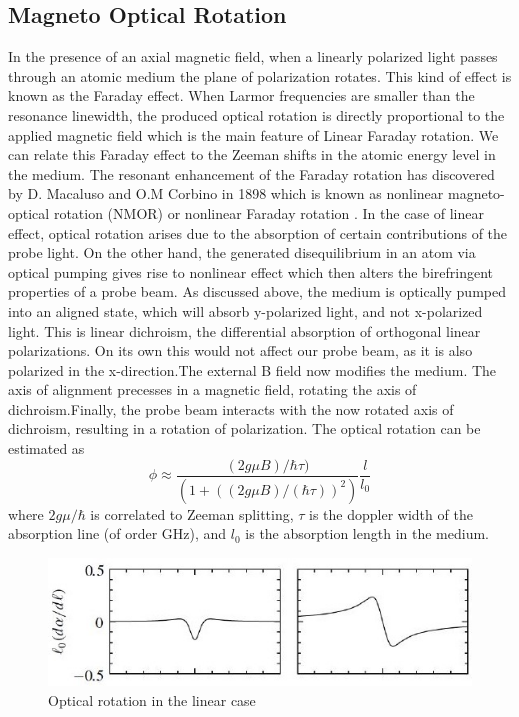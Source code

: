 \subsection{Magneto Optical Rotation}
\bigskip
In the presence of an axial magnetic field, when a linearly polarized light passes through an atomic medium the plane of polarization rotates. This kind of effect is known as the Faraday effect. When Larmor frequencies are smaller than the resonance linewidth, the produced optical rotation is directly proportional to the applied magnetic field which is the main feature of Linear Faraday rotation. We can relate this Faraday effect to the Zeeman shifts in the atomic energy level in the medium. The resonant enhancement of the Faraday rotation has discovered by D. Macaluso and O.M Corbino in 1898 which is known as nonlinear magneto-optical rotation (NMOR) or nonlinear Faraday rotation \cite{budker2013optical}. In the case of linear effect, optical rotation arises due to the absorption of certain contributions of the probe light. On the other hand, the generated disequilibrium in an atom via optical pumping gives rise to nonlinear effect which then alters the birefringent properties of a probe beam. 
As discussed above, the medium is optically pumped into an aligned state, which will
absorb y-polarized light, and not x-polarized light. This is linear dichroism, the differential absorption of orthogonal linear polarizations. On its own this would not affect our probe beam, as it is also polarized in the x-direction.The external B field now modifies the medium. The axis of alignment precesses in a
magnetic field, rotating the axis of dichroism.Finally, the probe beam interacts with the now rotated axis of dichroism, resulting in a rotation of polarization.
The optical rotation can be estimated as
\begin{equation}
\phi \approx \frac{(2g\mu B)/ \hbar\tau)}{(1+((2g\mu B)/(\hbar\tau))^2 )}\frac{l}{l_0}
\end{equation}
where $2g\mu/\hbar$ is correlated to Zeeman splitting, $\tau$ is the doppler width of the
absorption line (of order GHz), and $l_0$ is the absorption length in the medium. 
\begin{figure}
\centering
\includegraphics[width=0.85\linewidth]{figures/faraday_rotation}
\caption{Optical rotation in the linear case\cite{auzinsh2010optically}}
\end{figure}
